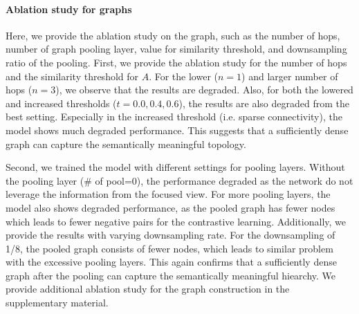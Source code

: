 \documentclass[letterpaper]{article} %
\begin{document}
\paragraph{Ablation study for graphs}
Here, we provide the ablation study on the graph,  such as the number of hops, number of graph pooling layer, value for similarity threshold, and downsampling ratio of the pooling. 
First, we provide the ablation study for the number of hops and the similarity threshold for $A$. For the lower ($n=1$) and larger number of hops ($n=3$), we observe that the results are degraded. Also, for both the lowered and increased thresholds ($t=0.0, 0.4, 0.6$), the results are also degraded from the best setting. 
Especially in the increased threshold (i.e. sparse connectivity), the model shows much degraded performance. 
This suggests that a sufficiently dense graph can capture the semantically meaningful topology.

Second, we trained the model with different settings for pooling layers. Without the pooling layer (\# of pool=0), the performance degraded as the network do not leverage the information from the focused view. For more pooling layers, the model also shows degraded performance, as the pooled graph has fewer nodes which leads to fewer negative pairs for the contrastive learning. Additionally, we provide the results with varying downsampling rate. For the downsampling of 1/8, the pooled graph consists of fewer nodes, which leads to similar problem with the excessive pooling layers. 
This again confirms that a sufficiently dense graph after the pooling can capture the semantically meaningful hiearchy. 
We provide additional ablation study for the graph construction in the supplementary material.
\end{document}
